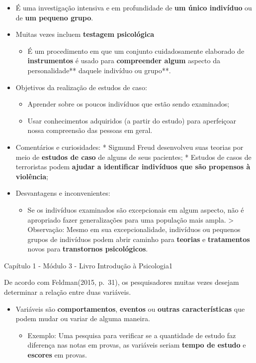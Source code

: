 \documentclass[
]{book}
\providecommand{\tightlist}{%
  \setlength{\itemsep}{0pt}\setlength{\parskip}{0pt}}
\begin{document}
\begin{itemize}
\tightlist
\item
  É uma investigação intensiva e em profundidade de \textbf{um único indivíduo} ou de \textbf{um pequeno grupo}.
\item
  Muitas vezes incluem \textbf{testagem psicológica}

  \begin{itemize}
  \tightlist
  \item
    É um procedimento em que um conjunto cuidadosamente elaborado de \textbf{instrumentos} é usado para \textbf{compreender algum }aspecto da personalidade** daquele indivíduo ou grupo**.
  \end{itemize}
\item
  Objetivos da realização de estudos de caso:

  \begin{itemize}
  \tightlist
  \item
    Aprender sobre os poucos indivíduos que estão sendo examinados;
  \item
    Usar conhecimentos adquiridos (a partir do estudo) para aperfeiçoar nossa compreensão das pessoas em geral.
  \end{itemize}
\item
  Comentários e curiosidades:
  * Sigmund Freud desenvolveu suas teorias por meio de \textbf{estudos de caso} de alguns de seus pacientes;
  * Estudos de casos de terroristas podem \textbf{ajudar a identificar indivíduos que são propensos à violência};
\item
  Desvantagens e inconvenientes:

  \begin{itemize}
  \tightlist
  \item
    Se os indivíduos examinados são excepcionais em algum aspecto, não é apropriado fazer generalizações para uma população mais ampla.
    \textgreater{} Observação: Mesmo em sua excepcionalidade, indivíduos ou pequenos grupos de indivíduos podem abrir caminho para \textbf{teorias} e \textbf{tratamentos} novos para \textbf{transtornos psicológicos}.
  \end{itemize}
\end{itemize}

Capítulo 1 - Módulo 3 - Livro Introdução à Psicologia1

De acordo com Feldman(2015, p.~31), os pesquisadores muitas vezes desejam determinar a relação entre duas variáveis.

\begin{itemize}
\tightlist
\item
  Variáveis são \textbf{comportamentos}, \textbf{eventos} ou \textbf{outras características} que podem mudar ou variar de alguma maneira.

  \begin{itemize}
  \tightlist
  \item
    Exemplo: Uma pesquisa para verificar se a quantidade de estudo faz diferença nas notas em provas, as
    variáveis seriam \textbf{tempo de estudo} e \textbf{escores} em provas.
  \end{itemize}
\end{itemize}
\end{document}
